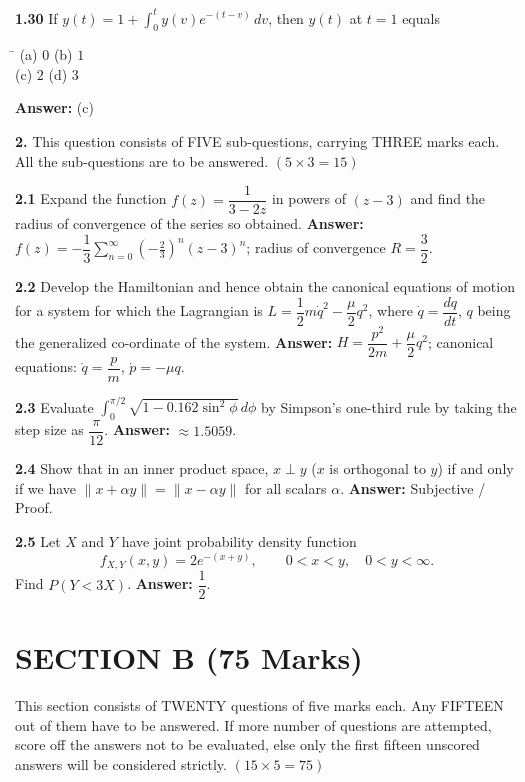 \documentclass[11pt,a4paper]{article}
\newcommand{\optsfour}[4]{%
  \begin{tabbing}
    \hspace{0.48\linewidth}\=\kill
    (a) #1 \> (b) #2 \\[2pt]
    (c) #3 \> (d) #4
  \end{tabbing}%
}
\newcommand{\ans}[1]{\textbf{Answer:} #1\par\medskip}
\begin{document}
\textbf{1.30} If $y(t) = 1 + \displaystyle\int_0^t y(v) e^{-(t-v)}\,dv$, then $y(t)$ at $t = 1$ equals
\optsfour{$0$}{$1$}{$2$}{$3$}
\ans{(c)}

\bigskip

\textbf{2.} This question consists of FIVE sub-questions, carrying THREE marks each. All the sub-questions are to be answered. \hfill $(5 \times 3 = 15)$

\medskip

\textbf{2.1} Expand the function $f(z) = \dfrac{1}{3 - 2z}$ in powers of $(z - 3)$ and find the radius of convergence of the series so obtained.
\ans{$f(z) = -\dfrac{1}{3}\displaystyle\sum_{n=0}^{\infty} \left(-\frac{2}{3}\right)^n (z - 3)^n$; radius of convergence $R = \dfrac{3}{2}$.}

\textbf{2.2} Develop the Hamiltonian and hence obtain the canonical equations of motion for a system for which the Lagrangian is $L = \dfrac{1}{2}m\dot{q}^2 - \dfrac{\mu}{2}q^2$, where $\dot{q} = \dfrac{dq}{dt}$, $q$ being the generalized co-ordinate of the system.
\ans{$H = \dfrac{p^2}{2m} + \dfrac{\mu}{2}q^2$; canonical equations: $\dot{q} = \dfrac{p}{m}$, $\dot{p} = -\mu q$.}

\textbf{2.3} Evaluate $\displaystyle\int_0^{\pi/2} \sqrt{1 - 0.162\sin^2\phi}\,d\phi$ by Simpson's one-third rule by taking the step size as $\dfrac{\pi}{12}$.
\ans{$\approx 1.5059$.}

\textbf{2.4} Show that in an inner product space, $x \perp y$ ($x$ is orthogonal to $y$) if and only if we have $\|x + \alpha y\| = \|x - \alpha y\|$ for all scalars $\alpha$.
\ans{Subjective / Proof.}

\textbf{2.5} Let $X$ and $Y$ have joint probability density function
\[
  f_{X,Y}(x,y) = 2e^{-(x+y)}, \qquad 0 < x < y, \quad 0 < y < \infty.
\]
Find $P(Y < 3X)$.
\ans{$\dfrac{1}{2}$.}

\section*{SECTION B (75 Marks)}

This section consists of TWENTY questions of five marks each. Any FIFTEEN out of them have to be answered. If more number of questions are attempted, score off the answers not to be evaluated, else only the first fifteen unscored answers will be considered strictly. \hfill $(15 \times 5 = 75)$

\medskip
\end{document}

